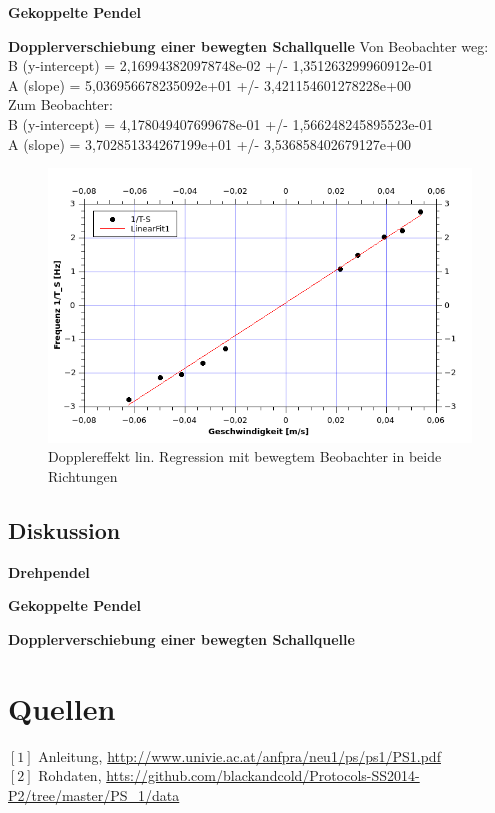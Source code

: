 \documentclass[12pt,a4paper]{article}
\begin{document}
\begin{multicols}{2}

\textbf{Gekoppelte Pendel}



\textbf{Dopplerverschiebung einer bewegten Schallquelle}
Von Beobachter weg:\\
B (y-intercept) = 2,169943820978748e-02 +/- 1,351263299960912e-01\\
A (slope) = 5,036956678235092e+01 +/- 3,421154601278228e+00\\

Zum Beobachter:\\
B (y-intercept) = 4,178049407699678e-01 +/- 1,566248245895523e-01\\
A (slope) = 3,702851334267199e+01 +/- 3,536858402679127e+00\\

\begin{figure}[H]
	\centering
	\includegraphics[scale=1.2]{./figure/Dopplereffekt.png}
	\caption{Dopplereffekt lin. Regression mit bewegtem Beobachter in beide Richtungen}
	\label{fig:doppler}
\end{figure}



\pagebreak
\subsection{Diskussion}
\textbf{Drehpendel}

\textbf{Gekoppelte Pendel}

\textbf{Dopplerverschiebung einer bewegten Schallquelle}


\section{Quellen}
$[1]$ Anleitung, \url{http://www.univie.ac.at/anfpra/neu1/ps/ps1/PS1.pdf}\\
$[2]$ Rohdaten, \url{htts://github.com/blackandcold/Protocols-SS2014-P2/tree/master/PS_1/data}\\

\end{multicols}
\end{document}
